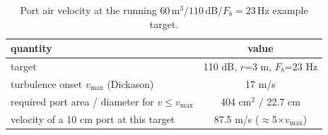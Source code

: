 \begin{table}[htbp]
\centering
\caption{Port air velocity at the running $60$\,m$^3$/$110$\,dB/$F_b{=}23$\,Hz example target.}
\label{tab:port-velocity}
\begin{tabular}{lc}
\toprule
quantity & value\\
\midrule
target & 110 dB, $r$=3 m, $F_b$=23 Hz\\
turbulence onset $v_{\max}$ (Dickason) & 17 m/s\\
required port area / diameter for $v\le v_{\max}$ & 404 cm$^2$ / 22.7 cm\\
velocity of a 10 cm port at this target & 87.5 m/s ($\approx$5$\times v_{\max}$)\\
\bottomrule
\end{tabular}
\end{table}

